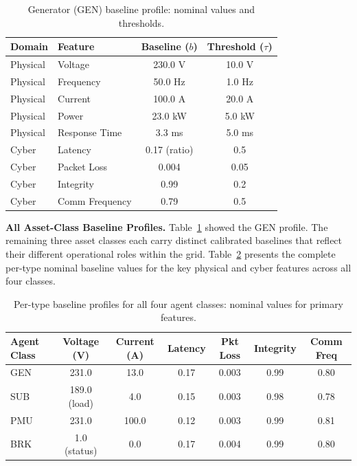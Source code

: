 \begin{table}[H]
\centering
\caption{Generator (GEN) baseline profile: nominal values and thresholds.}
\label{tab:gen_baseline}
\begin{tabular}{llcc}
\hline
\textbf{Domain} & \textbf{Feature} & \textbf{Baseline ($b$)} & \textbf{Threshold ($\tau$)} \\
\hline
Physical & Voltage     & 230.0 V   & 10.0 V  \\
Physical & Frequency   & 50.0 Hz   & 1.0 Hz  \\
Physical & Current     & 100.0 A   & 20.0 A  \\
Physical & Power       & 23.0 kW   & 5.0 kW  \\
Physical & Response Time & 3.3 ms  & 5.0 ms  \\
\hline
Cyber    & Latency       & 0.17 (ratio) & 0.5  \\
Cyber    & Packet Loss   & 0.004       & 0.05 \\
Cyber    & Integrity     & 0.99        & 0.2  \\
Cyber    & Comm Frequency & 0.79       & 0.5  \\
\hline
\end{tabular}
\end{table}

\par \vspace{0.35cm}
\textbf{All Asset-Class Baseline Profiles.} Table~\ref{tab:gen_baseline} showed the GEN profile. The remaining three asset classes each carry distinct calibrated baselines that reflect their different operational roles within the grid. Table~\ref{tab:all_baselines} presents the complete per-type nominal baseline values for the key physical and cyber features across all four classes.

\begin{table}[H]
\centering
\caption{Per-type baseline profiles for all four agent classes: nominal values for primary features.}
\label{tab:all_baselines}
\renewcommand{\arraystretch}{1.25}
\begin{tabular}{|l|c|c|c|c|c|c|}
\hline
\textbf{Agent Class} & \textbf{Voltage (V)} & \textbf{Current (A)} & \textbf{Latency} & \textbf{Pkt Loss} & \textbf{Integrity} & \textbf{Comm Freq} \\
\hline
GEN & 231.0 & 13.0 & 0.17 & 0.003 & 0.99 & 0.80 \\
\hline
SUB & 189.0 (load) & 4.0 & 0.15 & 0.003 & 0.98 & 0.78 \\
\hline
PMU & 231.0 & 100.0 & 0.12 & 0.003 & 0.99 & 0.81 \\
\hline
BRK & 1.0 (status) & 0.0 & 0.17 & 0.004 & 0.99 & 0.80 \\
\hline
\end{tabular}
\end{table}

